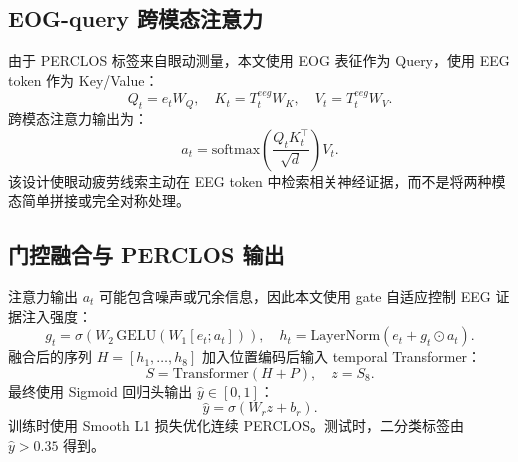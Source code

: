 \documentclass[UTF8,a4paper,10pt,fontset=windows]{ctexart}
\begin{document}
\subsection{EOG-query 跨模态注意力}
由于 PERCLOS 标签来自眼动测量，本文使用 EOG 表征作为 Query，使用 EEG token 作为 Key/Value：
\begin{equation}
Q_t=e_tW_Q,\quad K_t=T^{eeg}_tW_K,\quad V_t=T^{eeg}_tW_V.
\end{equation}
跨模态注意力输出为：
\begin{equation}
a_t=\mathrm{softmax}\left(\frac{Q_tK_t^\top}{\sqrt{d}}\right)V_t.
\end{equation}
该设计使眼动疲劳线索主动在 EEG token 中检索相关神经证据，而不是将两种模态简单拼接或完全对称处理。

\subsection{门控融合与 PERCLOS 输出}
注意力输出 $a_t$ 可能包含噪声或冗余信息，因此本文使用 gate 自适应控制 EEG 证据注入强度：
\begin{equation}
g_t=\sigma\left(W_2\,\mathrm{GELU}(W_1[e_t;a_t])\right),
\quad
h_t=\mathrm{LayerNorm}(e_t+g_t\odot a_t).
\end{equation}
融合后的序列 $H=[h_1,\ldots,h_8]$ 加入位置编码后输入 temporal Transformer：
\begin{equation}
S=\mathrm{Transformer}(H+P),\quad z=S_8.
\end{equation}
最终使用 Sigmoid 回归头输出 $\hat{y}\in[0,1]$：
\begin{equation}
\hat{y}=\sigma(W_rz+b_r).
\end{equation}
训练时使用 Smooth L1 损失优化连续 PERCLOS。测试时，二分类标签由 $\hat{y}>0.35$ 得到。
\end{document}
